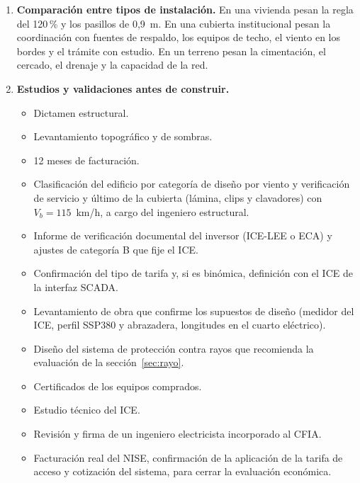 \documentclass[12pt]{article}
\begin{document}
\begin{enumerate}
\begin{itemize}
\end{itemize}
\item \textbf{Comparación entre tipos de instalación.} En una vivienda pesan la regla del 120\,\% y los pasillos de 0,9~m. En una cubierta institucional pesan la coordinación con fuentes de respaldo, los equipos de techo, el viento en los bordes y el trámite con estudio. En un terreno pesan la cimentación, el cercado, el drenaje y la capacidad de la red.
\item \textbf{Estudios y validaciones antes de construir.}
\begin{itemize}
\item Dictamen estructural.
\item Levantamiento topográfico y de sombras.
\item 12 meses de facturación.
\item Clasificación del edificio por categoría de diseño por viento y verificación de servicio y último de la cubierta (lámina, clips y clavadores) con $V_b=115$~km/h, a cargo del ingeniero estructural.
\item Informe de verificación documental del inversor (ICE-LEE o ECA) y ajustes de categoría B que fije el ICE.
\item Confirmación del tipo de tarifa y, si es binómica, definición con el ICE de la interfaz SCADA.
\item Levantamiento de obra que confirme los supuestos de diseño (medidor del ICE, perfil SSP380 y abrazadera, longitudes en el cuarto eléctrico).
\item Diseño del sistema de protección contra rayos que recomienda la evaluación de la sección~\ref{sec:rayo}.
\item Certificados de los equipos comprados.
\item Estudio técnico del ICE.
\item Revisión y firma de un ingeniero electricista incorporado al CFIA.
\item Facturación real del NISE, confirmación de la aplicación de la tarifa de acceso y cotización del sistema, para cerrar la evaluación económica.
\end{itemize}
\end{enumerate}
\end{document}
